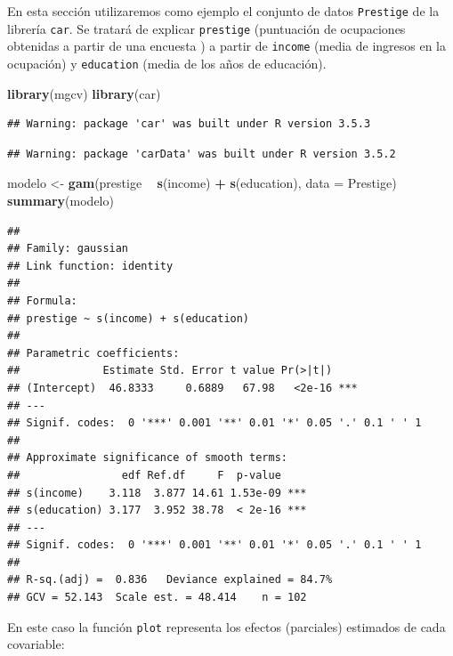 \documentclass[]{book}
\newenvironment{Shaded}{\begin{snugshade}}{\end{snugshade}}
\newcommand{\KeywordTok}[1]{\textcolor[rgb]{0.13,0.29,0.53}{\textbf{#1}}}
\newcommand{\DataTypeTok}[1]{\textcolor[rgb]{0.13,0.29,0.53}{#1}}
\newcommand{\StringTok}[1]{\textcolor[rgb]{0.31,0.60,0.02}{#1}}
\newcommand{\OperatorTok}[1]{\textcolor[rgb]{0.81,0.36,0.00}{\textbf{#1}}}
\newcommand{\NormalTok}[1]{#1}
\begin{document}
En esta sección utilizaremos como ejemplo el conjunto de datos
\texttt{Prestige} de la librería \texttt{car}. Se tratará de explicar
\texttt{prestige} (puntuación de ocupaciones obtenidas a partir de una
encuesta ) a partir de \texttt{income} (media de ingresos en la
ocupación) y \texttt{education} (media de los años de educación).

\begin{Shaded}
\begin{Highlighting}[]
\KeywordTok{library}\NormalTok{(mgcv)}
\KeywordTok{library}\NormalTok{(car)}
\end{Highlighting}
\end{Shaded}

\begin{verbatim}
## Warning: package 'car' was built under R version 3.5.3
\end{verbatim}

\begin{verbatim}
## Warning: package 'carData' was built under R version 3.5.2
\end{verbatim}

\begin{Shaded}
\begin{Highlighting}[]
\NormalTok{modelo <-}\StringTok{ }\KeywordTok{gam}\NormalTok{(prestige }\OperatorTok{~}\StringTok{ }\KeywordTok{s}\NormalTok{(income) }\OperatorTok{+}\StringTok{ }\KeywordTok{s}\NormalTok{(education), }\DataTypeTok{data =}\NormalTok{ Prestige)}
\KeywordTok{summary}\NormalTok{(modelo)}
\end{Highlighting}
\end{Shaded}

\begin{verbatim}
## 
## Family: gaussian 
## Link function: identity 
## 
## Formula:
## prestige ~ s(income) + s(education)
## 
## Parametric coefficients:
##             Estimate Std. Error t value Pr(>|t|)    
## (Intercept)  46.8333     0.6889   67.98   <2e-16 ***
## ---
## Signif. codes:  0 '***' 0.001 '**' 0.01 '*' 0.05 '.' 0.1 ' ' 1
## 
## Approximate significance of smooth terms:
##                edf Ref.df     F  p-value    
## s(income)    3.118  3.877 14.61 1.53e-09 ***
## s(education) 3.177  3.952 38.78  < 2e-16 ***
## ---
## Signif. codes:  0 '***' 0.001 '**' 0.01 '*' 0.05 '.' 0.1 ' ' 1
## 
## R-sq.(adj) =  0.836   Deviance explained = 84.7%
## GCV = 52.143  Scale est. = 48.414    n = 102
\end{verbatim}

En este caso la función \texttt{plot} representa los efectos (parciales)
estimados de cada covariable:
\end{document}
